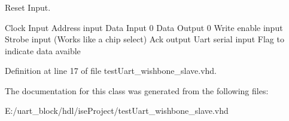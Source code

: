 \subsubsection[{uart\-\_\-wishbone\-\_\-slave}]{ {\bfseries  } \hspace{0.3cm}{\ttfamily  [Component]}}\label{classtest_uart__wishbone__slave_1_1behavior_a5c22d67786c8d4257bb37aa2efb6f261}


Reset Input. 

Clock Input Address input Data Input 0 Data Output 0 Write enable input Strobe input (Works like a chip select) Ack output Uart serial input Flag to indicate data avaible 

Definition at line 17 of file test\-Uart\-\_\-wishbone\-\_\-slave.\-vhd.



The documentation for this class was generated from the following files\-:\begin{DoxyCompactItemize}
\item 
E\-:/uart\-\_\-block/hdl/ise\-Project/test\-Uart\-\_\-wishbone\-\_\-slave.\-vhd\end{DoxyCompactItemize}
